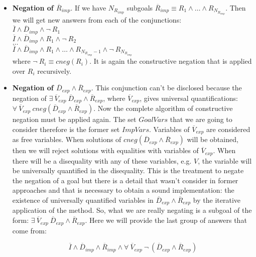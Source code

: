 \documentclass{llncs}
\begin{document}
\begin{itemize}
           \item {\bf Negation of $\overline{R}_{imp}$}. If we have
           $N_{R_{imp}}$ subgoals $\overline{R}_{imp} \equiv R_1
           \wedge \ldots \wedge R_{N_{R_{imp}}}$. Then we will get
           new answers from each of the conjunctions: \\

           $\overline{I} \wedge \overline{D}_{imp} \wedge \neg~ R_1 $ \\ 
           $\overline{I} \wedge \overline{D}_{imp} \wedge
           R_1 \wedge \neg~ R_2 $ \\ 
           $\ldots $ \\ 
           $\overline{I} \wedge \overline{D}_{imp} \wedge
           R_1 \wedge \ldots \wedge R_{N_{R_{imp}}-1} \wedge \neg~
           R_{N_{R_{imp}}}$ \\ 

           where $ \neg~ R_i \equiv cneg(R_i)$. It is again the
           constructive negation that is applied over $R_i$
           recursively.


           \item {\bf Negation of $\overline{D}_{exp} \wedge
           \overline{R}_{exp}$}. This conjunction can't be disclosed
           because the negation of $ \exists~ \overline{V}_{exp}~
           \overline{D}_{exp} \wedge \overline{R}_{exp}$, where
           $\overline{V}_{exp}$, gives universal quantifications:
           $\forall~ \overline{V}_{exp}~ cneg(\overline{D}_{exp}
           \wedge \overline{R}_{exp})$. Now the complete algorithm of
           constructive negation must be applied again. The set
           $GoalVars$ that we are going to consider therefore is the
           former set $ImpVars$. Variables of $\overline{V}_{exp}$ are
           considered as free variables. When solutions of
           $cneg(\overline{D}_{exp} \wedge \overline{R}_{exp})$ will
           be obtained, then we will reject solutions with equalities
           with variables of $\overline{V}_{exp}$. When there will be
           a disequality with any of these variables, e.g. $V$, the
           variable will be universally quantified in the disequality.
           This is the treatment to negate the negation of a goal but
           there is a detail that wasn't consider in former approaches
           and that is necessary to obtain a sound implementation: the
           existence of universally quantified variables in
           $\overline{D}_{exp} \wedge \overline{R}_{exp}$ by the
           iterative application of the method.  So, what we are
           really negating is a subgoal of the form: $ \exists~
           \overline{V}_{exp}~ \overline{D}_{exp} \wedge
           \overline{R}_{exp}$.  Here we will provide the last group
           of answers that come from:

           \[\overline{I} \wedge \overline{D}_{imp}
           \wedge \overline{R}_{imp} \wedge \forall~
           \overline{V}_{exp}~ \neg~(\overline{D}_{exp} \wedge
           \overline{R}_{exp})\]

         \end{itemize}
\end{document}

